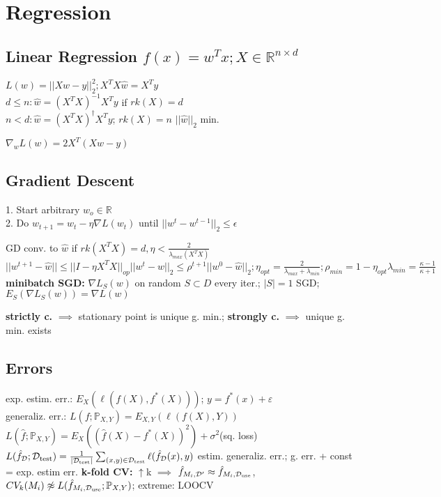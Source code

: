 \section*{Regression}
\subsection*{Linear Regression $f(x)=w^Tx; X \in \mathbb{R}^{n \times d}$}
$L(w) = ||Xw-y||^2_2; X^TX \hat{w} = X^T y$\\
\(d \leq n: \hat{w} = (X^TX)^{-1}X^Ty\) if \(rk(X) = d\)\\
\(n < d: \hat{w} = (X^TX)^\dag X^T y\); \(rk(X) = n\) \(||\hat{w}||_2\) min.

$\nabla_w L(w)  = 2X^T (Xw-y)$
\subsection*{Gradient Descent}
1. Start arbitrary $w_o \in \mathbb{R}$\\
2. Do $w_{t+1} = w_t - \eta \nabla L(w_t)$ until \(||w^t - w^{t-1}||_2 \leq \epsilon\)

GD conv. to \(\hat{w}\) if \(rk(X^TX) = d, \eta < \frac{2}{\lambda_{max}(X^TX)}\)
\(||w^{t+1} - \hat{w}||\leq ||I - \eta X^TX||_{op}||w^t-\hat{w}||_2 \leq 
\rho^{t+1}||w^0-\hat{w}||_2; \eta_{opt} = \frac{2}{\lambda_{max}+\lambda_{min}}; 
\rho_{min} = 1-\eta_{opt}\lambda_{min} = \frac{\kappa-1}{\kappa+1}\)
\textbf{minibatch SGD:} \(\nabla L_S(w)\) on random \(S \subset D\) every iter.; \(|S| = 1\) SGD; 
\(E_S(\nabla L_S(w)) = \nabla L(w)\)

\textbf{strictly c.} \(\implies\) stationary point is unique g. min.;
\textbf{strongly c.} \(\implies\) unique g. min. exists 
\subsection*{Errors}
exp. estim. err.: \(E_X(\ell(f(X), f^*(X)))\); \(y = f^*(x)+\varepsilon\)\\
generaliz. err.: \(L(f; \mathbb{P}_{X,Y}) = E_{X,Y}(\ell(f(X), Y))\)
\(L(\hat{f}; \mathbb{P}_{X,Y}) = E_X((\hat{f}(X) - f^*(X))^2) + \sigma^2\)(sq. loss)
\(L(\hat{f}_{\mathcal{D}}; \mathcal{D}_{\text{test}}) = 
\frac{1}{|\mathcal{D}_{\text{test}}|}\sum_{(x,y) \in \mathcal{D}_{\text{test}}}
\ell(\hat{f}_{\mathcal{D}}(x),y)\) estim. generaliz. err.; g. err. + const = exp. estim err.
\textbf{k-fold CV:} \(\uparrow\)k \(\implies\) \(\hat{f}_{M_i, \mathcal{D}'} \approx \hat{f}_{M_i, \mathcal{D_{\text{use}}}}\), 
\(CV_k(M_i) \not \approx L(\hat{f}_{M_i, \mathcal{D}_\text{use}};\mathbb{P}_{X, Y})\); extreme: LOOCV
